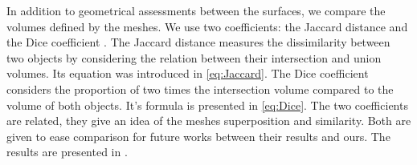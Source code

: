 In addition to geometrical assessments between the surfaces, we compare the volumes defined by the meshes. We use two coefficients: the Jaccard distance and the Dice coefficient \cite{munsell_2008_evaluating, ringenberg_2014_accurate}. The Jaccard distance measures the dissimilarity between two objects by considering the relation between their intersection and union volumes. Its equation was introduced in \eqref{eq:Jaccard}. The Dice coefficient considers the proportion of two times the intersection volume compared to the volume of both objects. It's formula is presented in \eqref{eq:Dice}. The two coefficients are related, they give an idea of the meshes superposition and similarity. Both are given to ease comparison for future works between their results and ours. The results are presented in . 




